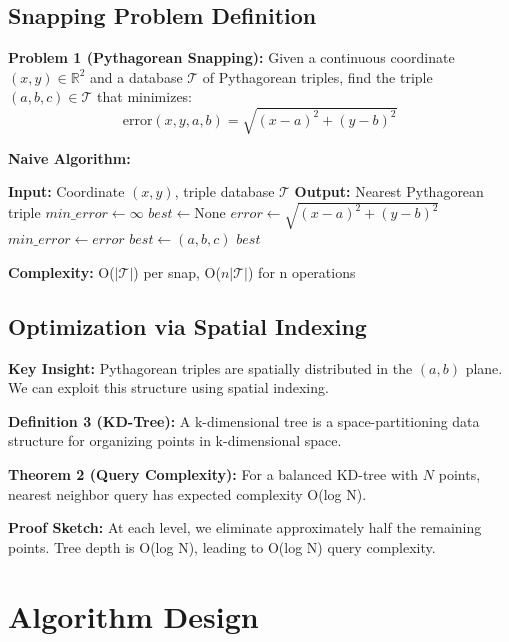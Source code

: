 \documentclass{article}
\begin{document}
\subsection{Snapping Problem Definition}

\textbf{Problem 1 (Pythagorean Snapping):} Given a continuous coordinate $(x, y) \in \mathbb{R}^2$ and a database $\mathcal{T}$ of Pythagorean triples, find the triple $(a, b, c) \in \mathcal{T}$ that minimizes:
\begin{equation}
\text{error}(x, y, a, b) = \sqrt{(x - a)^2 + (y - b)^2}
\end{equation}

\textbf{Naive Algorithm:}
\begin{algorithmic}[1]
\State \textbf{Input:} Coordinate $(x, y)$, triple database $\mathcal{T}$
\State \textbf{Output:} Nearest Pythagorean triple
\State $min\_error \leftarrow \infty$
\State $best \leftarrow \text{None}$
    \State $error \leftarrow \sqrt{(x - a)^2 + (y - b)^2}$
        \State $min\_error \leftarrow error$
        \State $best \leftarrow (a, b, c)$
    \EndIf
\EndFor
\State \Return $best$
\end{algorithmic}

\textbf{Complexity:} O($|\mathcal{T}|$) per snap, O($n|\mathcal{T}|$) for n operations

\subsection{Optimization via Spatial Indexing}

\textbf{Key Insight:} Pythagorean triples are spatially distributed in the $(a, b)$ plane. We can exploit this structure using spatial indexing.

\textbf{Definition 3 (KD-Tree):} A k-dimensional tree is a space-partitioning data structure for organizing points in k-dimensional space.

\textbf{Theorem 2 (Query Complexity):} For a balanced KD-tree with $N$ points, nearest neighbor query has expected complexity O(log N).

\textbf{Proof Sketch:} At each level, we eliminate approximately half the remaining points. Tree depth is O(log N), leading to O(log N) query complexity.

\section{Algorithm Design}
\end{document}
